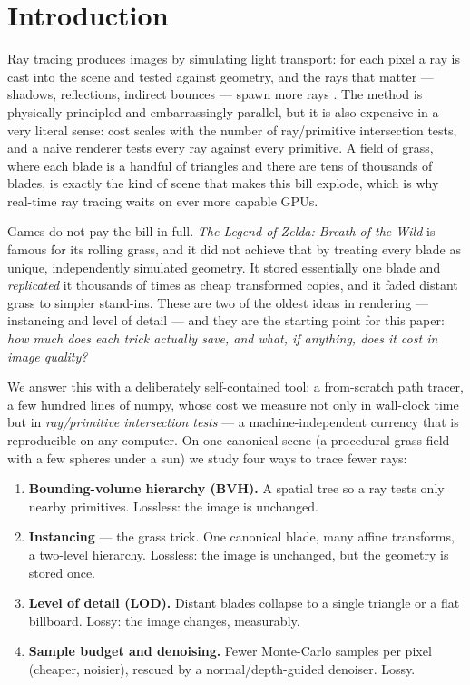 \section{Introduction}
\label{sec:intro}

Ray tracing produces images by simulating light transport: for each pixel a ray
is cast into the scene and tested against geometry, and the rays that matter ---
shadows, reflections, indirect bounces --- spawn more rays
\cite{whitted1980improved, kajiya1986rendering}. The method is physically
principled and embarrassingly parallel, but it is also expensive in a very
literal sense: cost scales with the number of ray/primitive intersection tests,
and a naive renderer tests every ray against every primitive. A field of grass,
where each blade is a handful of triangles and there are tens of thousands of
blades, is exactly the kind of scene that makes this bill explode, which is why
real-time ray tracing waits on ever more capable GPUs.

Games do not pay the bill in full. \emph{The Legend of Zelda: Breath of the
Wild} is famous for its rolling grass, and it did not achieve that by treating
every blade as unique, independently simulated geometry. It stored essentially
one blade and \emph{replicated} it thousands of times as cheap transformed
copies, and it faded distant grass to simpler stand-ins. These are two of the
oldest ideas in rendering --- instancing and level of detail --- and they are the
starting point for this paper: \emph{how much does each trick actually save, and
what, if anything, does it cost in image quality?}

We answer this with a deliberately self-contained tool: a from-scratch path
tracer, a few hundred lines of numpy, whose cost we measure not only in
wall-clock time but in \emph{ray/primitive intersection tests} --- a
machine-independent currency that is reproducible on any computer. On one
canonical scene (a procedural grass field with a few spheres under a sun) we
study four ways to trace fewer rays:

\begin{enumerate}
\item \textbf{Bounding-volume hierarchy (BVH).} A spatial tree so a ray tests
  only nearby primitives. Lossless: the image is unchanged.
\item \textbf{Instancing} --- the grass trick. One canonical blade, many affine
  transforms, a two-level hierarchy. Lossless: the image is unchanged, but the
  geometry is stored once.
\item \textbf{Level of detail (LOD).} Distant blades collapse to a single
  triangle or a flat billboard. Lossy: the image changes, measurably.
\item \textbf{Sample budget and denoising.} Fewer Monte-Carlo samples per pixel
  (cheaper, noisier), rescued by a normal/depth-guided denoiser. Lossy.
\end{enumerate}

